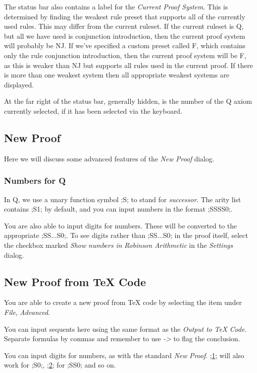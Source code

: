 \documentclass[a4paper]{article}
\begin{document}
The status bar also contains a label for the \emph{Current Proof System}. This is determined by finding the weakest rule preset that supports all of the currently used rules. This may differ from the current ruleset. If the current ruleset is Q, but all we have used is conjunction introduction, then the current proof system will probably be NJ. If we've specified a custom preset called F, which contains only the rule conjunction introduction, then the current proof system will be F, as this is weaker than NJ but supports all rules used in the current proof. If there is more than one weakest system then all appropriate weakest systems are displayed.

At the far right of the status bar, generally hidden, is the number of the Q axiom currently selected, if it has been selected via the keyboard.

\subsection{New Proof}
Here we will discuss some advanced features of the \emph{New Proof} dialog.

\subsubsection{Numbers for Q}
In Q, we use a unary function symbol ;S; to stand for \emph{successor}. The arity list contains ;S1; by default, and you can input numbers in the format ;SSSS0;.

You are also able to input digits for numbers. These will be converted to the appropriate ;SS...S0;. To see digits rather than ;SS...S0; in the proof itself, select the checkbox marked \emph{Show numbers in Robinson Arithmetic} in the \emph{Settings} dialog.

\subsection{New Proof from {\TeX} Code}
You are able to create a new proof from {\TeX} code by selecting the item under \emph{File}, \emph{Advanced}.

You can input sequents here using the same format as the \emph{Output to {\TeX} Code}. Separate formulas by commas and remember to use \emph{->} to flag the conclusion. 

You can input digits for numbers, as with the standard \emph{New Proof}. ;\ul{1}; will also work for ;S0;, ;\ul{2}; for ;SS0; and so on.
\end{document}
